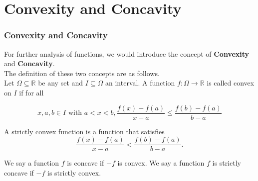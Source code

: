 \documentclass[12pt, t]{beamer}
\begin{document}
\section{Convexity and Concavity}
\begin{frame}
    \frametitle{Convexity and Concavity}

    For further analysis of functions, we would introduce the concept of \textbf{Convexity} and \textbf{Concavity}. \\
    The definition of these two concepts are as follows.\\

    \hspace{1em}
    Let $\Omega\subseteq\mathbb{R}$ be any set and $I\subseteq\Omega$ an interval. A function $f:\Omega\rightarrow\mathbb{R}$
    is called convex on $I$ if for all

    \begin{equation*}
        x, a, b\in I \text{ with } a<x<b, \frac{f(x)-f(a)}{x-a}\leq\frac{f(b)-f(a)}{b-a}
    \end{equation*}

    \vspace{0.5em}
    \hspace{1em}
    A strictly convex function is a function that satisfies
    \begin{equation}
        \frac{f(x)-f(a)}{x-a}<\frac{f(b)-f(a)}{b-a}.
    \end{equation}

    \hspace{1em}
    We say a function $f$ is concave if $-f$ is convex. We say a function $f$ is strictly concave if $-f$ is strictly convex.





\end{frame}
\end{document}

